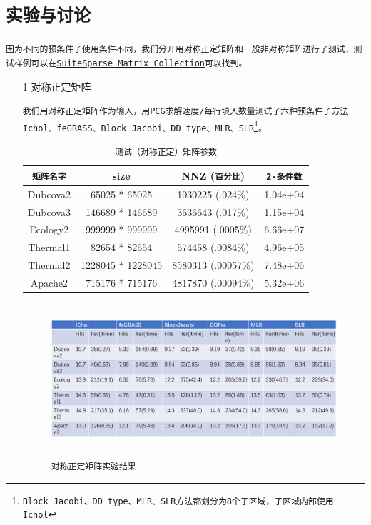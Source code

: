 \documentclass[11pt, a4paper]{article}
\theoremstyle{plain}
\theoremstyle{plain}
\theoremstyle{plain}
\theoremstyle{definition}
\theoremstyle{remark}
\theoremstyle{definition}
\newcommand{\T}[1]{\texttt{#1}}
\begin{document}
\section*{\T{实验与讨论}}
\T{因为不同的预条件子使用条件不同，我们分开用对称正定矩阵和一般非对称矩阵进行了测试，测试样例可以在\href{http://sparse.tamu.edu/}{SuiteSparse Matrix Collection}可以找到\cite{Test}。}
\begin{itemize}
	\item[1] 对称正定矩阵
	
	\T{我们用对称正定矩阵作为输入，用PCG求解速度/每行填入数量测试了六种预条件子方法Ichol、feGRASS、Block Jacobi、DD type、MLR、SLR\footnote{Block Jacobi、DD type、MLR、SLR方法都划分为8个子区域，子区域内部使用Ichol}。}
	
	\begin{center}
		\begin{table}[H]
			\caption{\T{测试（对称正定）矩阵参数}}
			\begin{center}
				\begin{tabular}{ c|c|c|c}
					\T{矩阵名字} & size & NNZ (\T{百分比}) & \T{2-条件数} \\
					\hline
					Dubcova2 & 65025 * 65025 & 1030225 (.024\%) & 1.04e+04 \\
					\hline
					Dubcova3 & 146689 * 146689 & 3636643 (.017\%) & 1.15e+04 \\
					\hline
					Ecology2 & 999999 * 999999 & 4995991 (.0005\%) & 6.66e+07 \\
					\hline
					Thermal1 & 82654 * 82654 & 574458 (.0084\%) & 4.96e+05	\\
					\hline
					Thermal2 & 1228045 * 1228045 & 8580313 (.00057\%) & 7.48e+06 \\
					\hline
					Apache2 & 715176 * 715176 & 4817870 (.00094\%) & 5.32e+06 \\											
				\end{tabular}
			\end{center}
		\end{table}
	\end{center}
	
	\begin{figure}[H]
		\caption{\T{对称正定矩阵实验结果}}
		\centering
		\includegraphics[width=350pt,height=160pt]{SPD_res.png}
	\end{figure}



\end{itemize}
\end{document}
